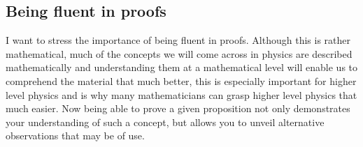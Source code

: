 \documentclass[12pt]{article}
\theoremstyle{break}
\begin{document}
\subsection{Being fluent in proofs}
I want to stress the importance of being fluent in proofs. Although this is rather mathematical, much of the concepts we will come across in physics are described mathematically and understanding them at a mathematical level will enable us to comprehend the material that much better, this is especially important for higher level physics and is why many mathematicians can grasp higher level physics that much easier. Now being able to prove a given proposition not only demonstrates your understanding of such a concept, but allows you to unveil alternative observations that may be of use.
\end{document}
